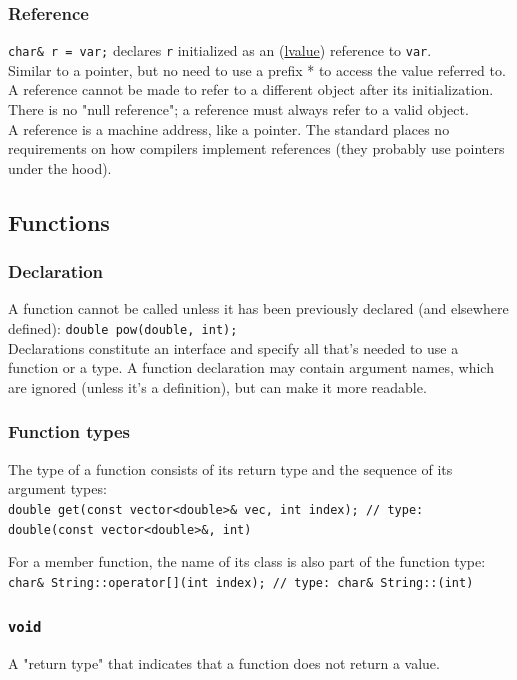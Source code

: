 \documentclass[table, xcdraw]{article}%
\begin{document}
\subsubsection{Reference} \label{reference}
\texttt{char& r = var;} declares \texttt{r} initialized as an (\hyperref[lvalue]{lvalue}) reference to \texttt{var}.\\
Similar  to  a  pointer, but no need to use a prefix * to access the value referred to.\\
A reference cannot be made to refer to a different object after its initialization.\\
There  is  no  "null  reference"; a reference must always refer to a valid object.\\
A reference is a machine address, like a pointer. The standard places no requirements on how compilers implement references (they probably use pointers under the hood).

\subsection{Functions}

\subsubsection{Declaration}
A function cannot be called unless it has been previously declared (and elsewhere defined): \texttt{double pow(double, int);}\\
Declarations constitute an interface and specify all that's needed to use a  function or a type. A function declaration may contain argument names, which are ignored (unless it's a definition), but can make it more readable.

\subsubsection{Function types}
The type of a function consists of its return type and the sequence of its argument types:\\
\texttt{double get(const vector<double>& vec, int index); // type: double(const vector<double>&, int)}

For a member function, the name of its class is also part of the function type:\\
\texttt{char& String::operator[](int index); // type: char& String::(int)}

\subsubsection{\texttt{void}}
A "return type" that indicates that a function does not return a value.
\end{document}
